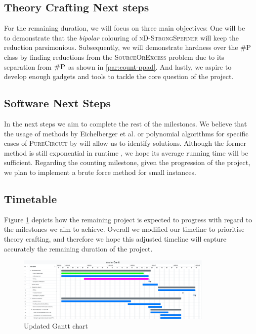 \subsection{Theory Crafting Next steps}

For the remaining duration, we will focus on three main objectives:
One will be to demonstrate that the \textit{bipolar} colouring
of \textsc{nD-StrongSperner} will keep the reduction parsimonious.
Subsequently, we will demonstrate hardness over the \textsc{\#P} class by finding
reductions from the \textsc{SourceOrExcess} problem due to its separation from $\textsc{\#P}$ as shown in \ref{par:count-ppad}.
And lastly, we aspire to develop enough gadgets and tools to tackle the core question of the project.


\subsection{Software Next Steps}

In the next steps we aim to complete the rest of the milestones. 
We believe that the usage of methods by Eichelberger et al. \cite{eichelberger_HazardDetectionCombinational_1965}
or polynomial algorithms for specific cases of \textsc{PureCircuit} by \cite{deligkas_PureCircuitTightInapproximability_2024}
will allow us to identify solutions.
Although the former method is still exponential in runtime \cite{eichelberger_HazardDetectionCombinational_1965,ikenmeyer_ComplexityHazardfreeCircuits_2019},
we hope its average running time will be sufficient.
Regarding the counting milestone, given the progression of the project, we plan to implement a brute force method
for small instances.

\subsection{Timetable}

Figure \ref{fig:gantt-new} depicts how the remaining project is expected to progress with regard
to the milestones we aim to achieve. Overall we modified our timeline to prioritise
theory crafting, and therefore we hope this adjusted timeline will capture accurately the remaining duration
of the project.

\begin{figure}[h!]
    \centering
    \includegraphics[width=0.85\textwidth]{assets/Interim Gantt 20250708.pdf}
    \caption{Updated Gantt chart}\label{fig:gantt-new}
\end{figure}

